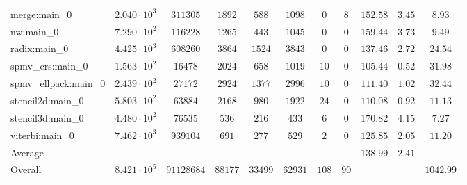 \begin{tabular}{|l|c|c|c|c|c|c|c|c|c|c|}
merge:main\_0          & $ 2.040 \cdot 10^{3} $ & $ 311305   $ & $ 1892  $ & $ 588   $ & $ 1098  $ & $ 0   $ & $ 8  $ & $ 152.58      $ & $ 3.45    $ & $ 8.93    $ \\
nw:main\_0             & $ 7.290 \cdot 10^{2} $ & $ 116228   $ & $ 1265  $ & $ 443   $ & $ 1045  $ & $ 0   $ & $ 0  $ & $ 159.44      $ & $ 3.73    $ & $ 9.49    $ \\
radix:main\_0          & $ 4.425 \cdot 10^{3} $ & $ 608260   $ & $ 3864  $ & $ 1524  $ & $ 3843  $ & $ 0   $ & $ 0  $ & $ 137.46      $ & $ 2.72    $ & $ 24.54   $ \\
spmv\_crs:main\_0      & $ 1.563 \cdot 10^{2} $ & $ 16478    $ & $ 2024  $ & $ 658   $ & $ 1019  $ & $ 10  $ & $ 0  $ & $ 105.44      $ & $ 0.52    $ & $ 31.98   $ \\
spmv\_ellpack:main\_0  & $ 2.439 \cdot 10^{2} $ & $ 27172    $ & $ 2924  $ & $ 1377  $ & $ 2996  $ & $ 10  $ & $ 0  $ & $ 111.40      $ & $ 1.02    $ & $ 32.44   $ \\
stencil2d:main\_0      & $ 5.803 \cdot 10^{2} $ & $ 63884    $ & $ 2168  $ & $ 980   $ & $ 1922  $ & $ 24  $ & $ 0  $ & $ 110.08      $ & $ 0.92    $ & $ 11.13   $ \\
stencil3d:main\_0      & $ 4.480 \cdot 10^{2} $ & $ 76535    $ & $ 536   $ & $ 216   $ & $ 433   $ & $ 6   $ & $ 0  $ & $ 170.82      $ & $ 4.15    $ & $ 7.27    $ \\
viterbi:main\_0        & $ 7.462 \cdot 10^{3} $ & $ 939104   $ & $ 691   $ & $ 277   $ & $ 529   $ & $ 2   $ & $ 0  $ & $ 125.85      $ & $ 2.05    $ & $ 11.20   $ \\
\hline
Average                & $                    $ & $          $ & $       $ & $       $ & $       $ & $     $ & $    $ & $ 138.99      $ & $ 2.41    $ & $         $ \\
\hline
Overall                & $ 8.421 \cdot 10^{5} $ & $ 91128684 $ & $ 88177 $ & $ 33499 $ & $ 62931 $ & $ 108 $ & $ 90 $ & $             $ & $         $ & $ 1042.99 $ \\
\hline
\end{tabular}
